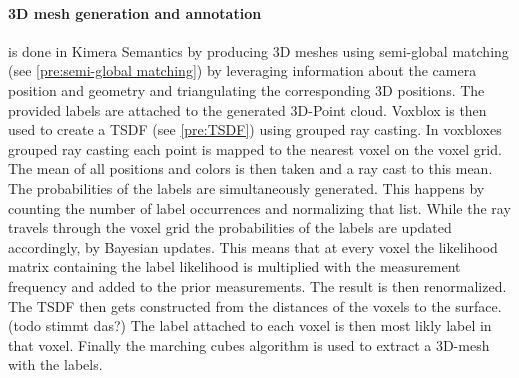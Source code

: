 \documentclass[11pt,a4paper]{article}
\begin{document}
\paragraph{3D mesh generation and annotation}
is done in Kimera Semantics by producing 3D meshes using semi-global matching (see \ref{pre:semi-global matching}) by leveraging information about the camera position and geometry and triangulating the corresponding 3D positions.
The provided labels are attached to the generated 3D-Point cloud. 
Voxblox is then used to create a TSDF (see \ref{pre:TSDF}) using grouped ray casting.
In voxbloxes grouped ray casting each point is mapped to the nearest voxel on the voxel grid. 
The mean of all positions and colors is then taken and a ray cast to this mean. 
The probabilities of the labels are simultaneously generated. 
This happens by counting the number of label occurrences and normalizing that list. 
While the ray travels through the voxel grid the probabilities of the labels are updated accordingly, by Bayesian updates. 
This means that at every voxel the likelihood matrix containing the label likelihood is multiplied with the measurement frequency and added to the prior measurements. 
The result is then renormalized. 
The TSDF then gets constructed from the distances of the voxels to the surface. (todo stimmt das?)
The label attached to each voxel is then most likly label in that voxel.
Finally the marching cubes algorithm is used to extract a 3D-mesh with the labels.
\end{document}

